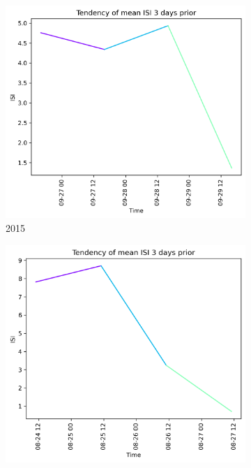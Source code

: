 \begin{figure}[h]
	\centering
	\caption{ISI values 3 days prior to wildfire}
	\begin{subfigure}{0.3\textwidth}
		\centering
		\includegraphics[width=\textwidth]{graphs/3days/2015_3daysprior_tendency_graph_ISI.png}
		\caption{2015}
		\label{fig:isi_prior_3_days_2015}
	\end{subfigure}
	\hfill
	\begin{subfigure}{0.3\textwidth}
		\centering
		\includegraphics[width=\textwidth]{graphs/3days/2019_3daysprior_tendency_graph_ISI.png}

\end{subfigure}
\end{figure}
